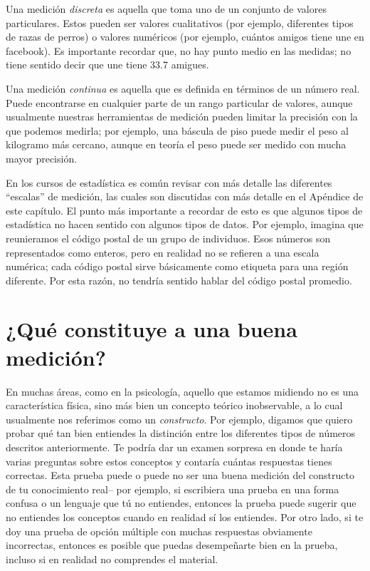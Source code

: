 \documentclass[
  12pt,
]{book}
\theoremstyle{definition}
\theoremstyle{definition}
\theoremstyle{definition}
\theoremstyle{remark}
\begin{document}
Una medición \emph{discreta} es aquella que toma uno de un conjunto de valores particulares. Estos pueden ser valores cualitativos (por ejemplo, diferentes tipos de razas de perros) o valores numéricos (por ejemplo, cuántos amigos tiene une en facebook). Es importante recordar que, no hay punto medio en las medidas; no tiene sentido decir que une tiene 33.7 amigues.

Una medición \emph{continua} es aquella que es definida en términos de un número real. Puede encontrarse en cualquier parte de un rango particular de valores, aunque usualmente nuestras herramientas de medición pueden limitar la precisión con la que podemos medirla; por ejemplo, una báscula de piso puede medir el peso al kilogramo más cercano, aunque en teoría el peso puede ser medido con mucha mayor precisión.

En los cursos de estadística es común revisar con más detalle las diferentes ``escalas'' de medición, las cuales son discutidas con más detalle en el Apéndice de este capítulo. El punto más importante a recordar de esto es que algunos tipos de estadística no hacen sentido con algunos tipos de datos. Por ejemplo, imagina que reunieramos el código postal de un grupo de individuos. Esos números son representados como enteros, pero en realidad no se refieren a una escala numérica; cada código postal sirve básicamente como etiqueta para una región diferente. Por esta razón, no tendría sentido hablar del código postal promedio.

\hypertarget{quuxe9-constituye-a-una-buena-mediciuxf3n}{%
\section{¿Qué constituye a una buena medición?}\label{quuxe9-constituye-a-una-buena-mediciuxf3n}}

En muchas áreas, como en la psicología, aquello que estamos midiendo no es una característica física, sino más bien un concepto teórico inobservable, a lo cual usualmente nos referimos como un \emph{constructo}. Por ejemplo, digamos que quiero probar qué tan bien entiendes la distinción entre los diferentes tipos de números descritos anteriormente. Te podría dar un examen sorpresa en donde te haría varias preguntas sobre estos conceptos y contaría cuántas respuestas tienes correctas. Esta prueba puede o puede no ser una buena medición del constructo de tu conocimiento real-- por ejemplo, si escribiera una prueba en una forma confusa o un lenguaje que tú no entiendes, entonces la prueba puede sugerir que no entiendes los conceptos cuando en realidad sí los entiendes. Por otro lado, si te doy una prueba de opción múltiple con muchas respuestas obviamente incorrectas, entonces es posible que puedas desempeñarte bien en la prueba, incluso si en realidad no comprendes el material.
\end{document}
